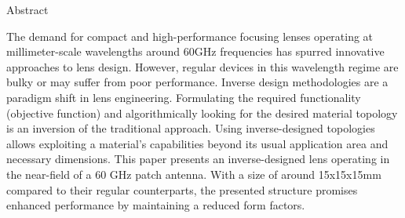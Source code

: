 \begin{frame}[t]
\begin{columns}[t]
\separatorcolumn
\begin{column}{\colwidth}
    \begin{block}{Abstract}

    
       The demand for compact and high-performance focusing lenses operating at millimeter-scale wavelengths around 60GHz frequencies has spurred innovative approaches to lens design. However, regular devices in this wavelength regime are bulky or may suffer from poor performance. Inverse design methodologies are a paradigm shift in lens engineering. Formulating the required functionality (objective function) and algorithmically looking for the desired material topology is an inversion of the traditional approach. Using inverse-designed topologies allows exploiting a material's capabilities beyond its usual application area and necessary dimensions. This paper presents an inverse-designed lens operating in the near-field of a 60 GHz patch antenna. With a size of around 15x15x15mm compared to their regular counterparts, the presented structure promises enhanced performance by maintaining a reduced form factors. 
    \end{block}


\end{column}
\end{columns}
\end{frame}
